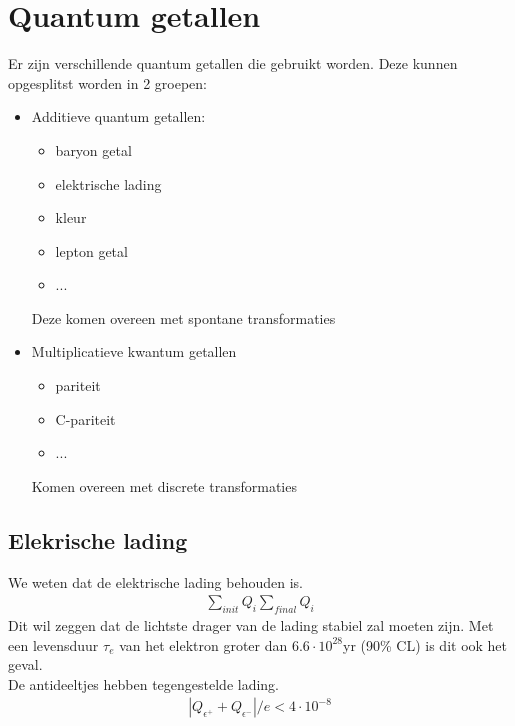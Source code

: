 \documentclass[../main.tex]{subfiles}
\begin{document}
\section{Quantum getallen}%
\label{sec:quantum_getallen}

Er zijn verschillende quantum getallen die gebruikt worden. Deze kunnen opgesplitst worden in 2 groepen:
\begin{itemize}
    \item Additieve quantum getallen:
        \begin{itemize}
            \item baryon getal
            \item elektrische lading
            \item kleur
            \item lepton getal
            \item ...
        \end{itemize}
        Deze komen overeen met spontane transformaties
    \item Multiplicatieve kwantum getallen
        \begin{itemize}
            \item pariteit
            \item C-pariteit
            \item ...
        \end{itemize}
        Komen overeen met discrete transformaties
\end{itemize}

\subsection{Elekrische lading}%
\label{sub:elekrische_lading}

We weten dat de elektrische lading behouden is.
\begin{equation}
    \begin{aligned}
        \label{eq:cons_lading}
        \sum_{init} Q_i \sum_{final} Q_i
    \end{aligned}
\end{equation}
Dit wil zeggen dat de lichtste drager van de lading stabiel zal moeten zijn. Met een levensduur $\tau_e$ van het elektron groter dan $6.6\cdot 10^{28}$yr (90\% CL) is dit ook het geval.\\
De antideeltjes hebben tegengestelde lading.
\begin{equation}
    \begin{aligned}
        \label{eq:anti_deeltje_lading}
        |Q_{\epsilon^+}+Q_{\epsilon^-}|/e < 4\cdot 10^{-8}
    \end{aligned}
\end{equation}
\end{document}
